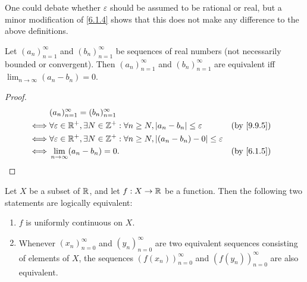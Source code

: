 \begin{rmk}\label{9.9.6}
  One could debate whether \(\varepsilon\) should be assumed to be rational or real, but a minor modification of \cref{6.1.4} shows that this does not make any difference to the above definitions.
\end{rmk}

\begin{lem}\label{9.9.7}
  Let \((a_n)_{n = 1}^\infty\) and \((b_n)_{n = 1}^\infty\) be sequences of real numbers
  (not necessarily bounded or convergent).
  Then \((a_n)_{n = 1}^\infty\) and \((b_n)_{n = 1}^\infty\) are equivalent iff \(\lim_{n \to \infty} (a_n - b_n) = 0\).
\end{lem}

\begin{proof}
  \begin{align*}
         & (a_n)_{n = 1}^\infty = (b_n)_{n = 1}^\infty                                                                                 \\
    \iff & \forall \varepsilon \in \R^+, \exists N \in \Z^+ : \forall n \geq N, \abs{a_n - b_n} \leq \varepsilon       &  & \by{9.9.5} \\
    \iff & \forall \varepsilon \in \R^+, \exists N \in \Z^+ : \forall n \geq N, \abs{(a_n - b_n) - 0} \leq \varepsilon                 \\
    \iff & \lim_{n \to \infty} (a_n - b_n) = 0.                                                                        &  & \by{6.1.5}
  \end{align*}
\end{proof}

\begin{prop}\label{9.9.8}
  Let \(X\) be a subset of \(\mathbb{R}\), and let \(f : X \to \mathbb{R}\) be a function.
  Then the following two statements are logically equivalent:
  \begin{enumerate}
    \item \(f\) is uniformly continuous on \(X\).
    \item Whenever \((x_n)_{n = 0}^\infty\) and \((y_n)_{n = 0}^\infty\) are two equivalent sequences consisting of elements of \(X\), the sequences \((f(x_n))_{n = 0}^\infty\) and \((f(y_n))_{n = 0}^\infty\) are also equivalent.
  \end{enumerate}
\end{prop}

